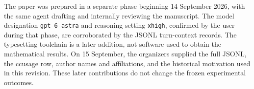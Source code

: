 The paper was prepared in a separate phase beginning
14 September 2026, with the same agent drafting and internally
reviewing the manuscript. The model designation \texttt{gpt-6-astra}
and reasoning setting \texttt{xhigh}, confirmed by the user during
that phase, are corroborated by the JSONL turn-context records.
The typesetting toolchain is a later addition, not software used
to obtain the mathematical results. On 15 September, the organizers
supplied the full JSONL, the ccusage row, author names and affiliations,
and the historical motivation used in this revision. These later
contributions do not change the frozen experimental outcomes.
